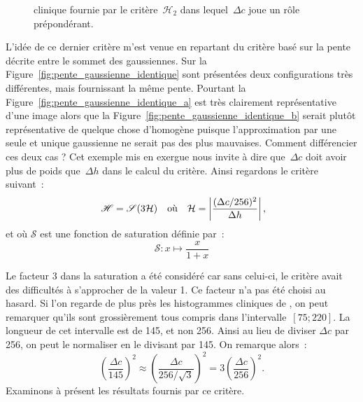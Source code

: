 \documentclass[main.tex]{subfiles}
\begin{document}
\begin{figure}[h]
\centering
{}
\caption{\label{fig:critere_dc2_sur_dh}\Hetero clinique fournie par le critère~$\mathcal{H}_{2}$ dans lequel~$\Delta c$ joue un rôle prépondérant.}
\end{figure}
L'idée de ce dernier critère m'est venue %
en repartant du critère  %
basé sur la pente décrite entre le sommet des gaussiennes. Sur la Figure~\ref{fig:pente_gaussienne_identique} sont présentées deux configurations très différentes, mais fournissant la même pente. Pourtant la Figure~\ref{fig:pente_gaussienne_identique_a} est très clairement représentative d'une image \heterogene alors que la Figure~\ref{fig:pente_gaussienne_identique_b} serait plutôt représentative de quelque chose d'homogène puisque l'approximation par une seule et unique gaussienne ne serait pas des plus mauvaises. 
Comment différencier ces deux cas ? Cet exemple mis en exergue nous invite à dire que~$\Delta c$ doit avoir plus de poids que~$\Delta h$ dans le calcul du critère\HH. %
Ainsi regardons le critère suivant~:
\begin{equation}\label{eq:def_bon_critere}
~\mathscr{H} = \mathscr{S}(3\mathcal{H}) \quad \textrm{où} \quad \mathcal{H}=\left| \dfrac{(\Delta c /256)^2}{\Delta h} \right|,
\end{equation}
et où $\mathscr{S}$ est une fonction de saturation définie par~:
\begin{equation}
\mathscr{S} : x \mapsto \dfrac{x}{1+x}
\end{equation}

Le facteur 3 dans la saturation a été considéré car sans celui-ci, le critère avait des difficultés à s'approcher de la valeur 1. Ce facteur n'a pas été choisi au hasard. %
Si l'on regarde de plus près les histogrammes cliniques de \Nber, on peut remarquer qu'ils sont grossièrement tous compris dans l'intervalle~$[75;220]$. La longueur de cet intervalle est de 145, et non 256. Ainsi au lieu de diviser $\Delta c$ par 256, on peut le normaliser en le divisant par 145. On remarque alors~:
\begin{equation}
\left(\frac{\Delta c}{145}\right)^2 \approx \left(\frac{\Delta c}{256/\sqrt{3}}\right)^2 =  3 \left(\frac{\Delta c}{256}\right)^2.
\end{equation}
Examinons à présent les résultats fournis par ce critère.
\end{document}
